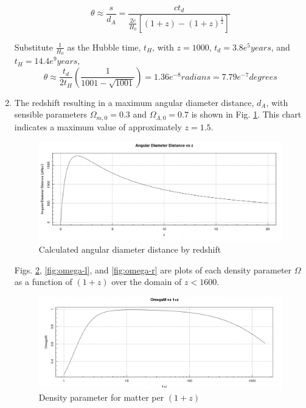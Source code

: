\documentclass{paper}
\begin{document}
\begin{enumerate}
      \[
        \theta \approx \frac{s}{d_A} = \frac{ct_d}
        {\frac{2c}{H_0}\left[(1+z)-(1+z)^\frac{1}{2}\right]}
      \]

      Substitute \(\frac{1}{H_0}\) as the Hubble time, \(t_H\), with
      \(z = 1000\), \(t_d = 3.8e^5 \si{years}\), and 
      \(t_H = 14.4e^9 \si{years}\),
      \[
        \theta \approx \frac{t_d}{2t_H}\left(\frac{1}{1001-\sqrt{1001}}\right)
        = 1.36e^{-8} \si{radians} = 7.79e^{-7} \si{degrees}
      \]

    \item %
      The redshift resulting in a maximum angular diameter distance,
      \(d_A\), with sensible parameters \(\Omega_{m,0} = 0.3\) and
      \(\Omega_{\Lambda,0} = 0.7\) is shown in Fig. 
      \ref{fig:angular-diameter-distance}. This chart indicates a maximum
      value of approximately \(z = 1.5\).
      \begin{figure}[H]
        \includegraphics[width=\linewidth]{angular-diameter-distance.png}
        \caption{Calculated angular diameter distance by redshift}
        \label{fig:angular-diameter-distance}
      \end{figure}

      Figs. \ref{fig:omega-m}, \ref{fig:omega-l}, and \ref{fig:omega-r} 
      are plots of each density parameter \(\Omega\) as a function of 
      \((1+z)\) over the domain of \(z < 1600\).

      \begin{figure}[H]
        \includegraphics[width=\linewidth]{omega-m.png}
        \caption{Density parameter for matter per \((1+z)\)}
        \label{fig:omega-m}
      \end{figure}


\end{enumerate}
\end{document}
